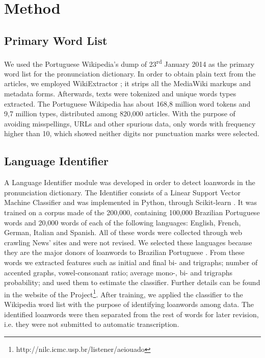 \section{Method}

\subsection{Primary Word List}

We used the Portuguese Wikipedia's dump of 23\textsuperscript{rd} January 2014 as the primary word
list for the pronunciation dictionary. In order to obtain plain text from the articles, we employed WikiExtractor \cite{Wikiextractor2013};
it strips all the  MediaWiki markups and metadata forms. Afterwards, texts were tokenized and unique words types extracted. 
The Portuguese Wikipedia has about 168,8 million word tokens and 9,7 million types, distributed among  820,000 articles.
With the purpose of avoiding misspellings, URLs and other spurious data, only words with frequency higher than 10, 
which showed neither digits nor punctuation marks were selected. 

\subsection{Language Identifier}


A Language Identifier module was developed in order to detect loanwords in the pronunciation dictionary.
The Identifier consists of a Linear Support Vector Machine Classifier \cite{Steinwart2008} and was implemented in Python, 
through Scikit-learn \cite{Scikit2011}. It was trained on a corpus made of the 200,000, containing 100,000 Brazilian Portuguese
words and 20,000 words of each of the following languages: English, French, German, Italian and Spanish. All of these words were 
collected through web crawling News' sites and were not revised.
We selected these languages because they are the major donors of loanwords to Brazilian
Portuguese \cite{Alves2001}. From these words we extracted features such as initial and final bi- and trigraphs; 
number of accented graphs, vowel-consonant ratio; average mono-, bi- and trigraphs probability; and used 
them to estimate the classifier. Further details can be found in the website of the Project\footnote{http://nilc.icmc.usp.br/listener/aeiouado}. After training,
we applied the classifier to the Wikipedia word list with the purpose of identifying
loanwords among data. The identified loanwords were then separated from the rest of words for later 
revision, i.e. they were not submitted to automatic transcription.

